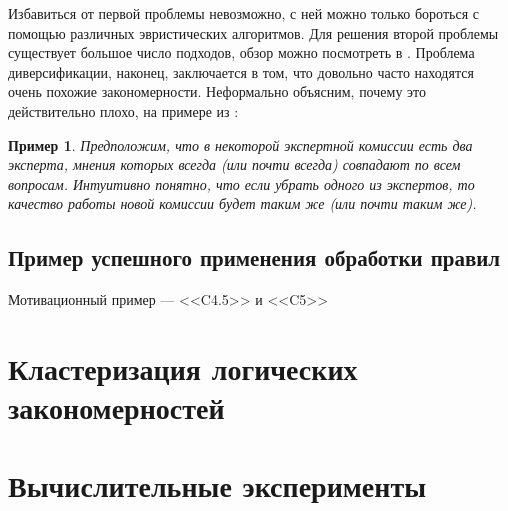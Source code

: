 \documentclass[12pt]{article}
\newtheorem{example}{Пример}
\begin{document}
Избавиться от первой проблемы невозможно, с ней можно только бороться
с помощью различных эвристических алгоритмов. Для решения второй
проблемы существует большое число подходов, обзор можно посмотреть в
\cite{furnkranz97pruning}. Проблема диверсификации, наконец,
заключается в том, что довольно часто находятся очень похожие
закономерности. Неформально объясним, почему это действительно плохо,
на примере из \cite{voron10logicalgs}:

\begin{example}
  Предположим, что в некоторой экспертной комиссии есть два эксперта,
  мнения которых всегда (или почти всегда) совпадают по всем
  вопросам. Интуитивно понятно, что если убрать одного из экспертов,
  то качество работы новой комиссии будет таким же (или почти таким
  же).
\end{example}

\subsection{Пример успешного применения обработки правил}

Мотивационный пример --- <<C4.5>> и <<C5>>

\section{Кластеризация логических закономерностей}



\section{Вычислительные эксперименты}

\end{document}
